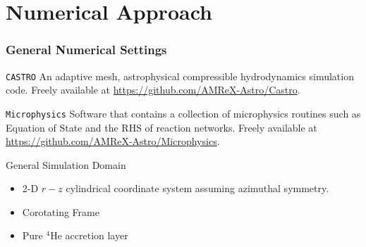 \documentclass[
	11pt, %
]{beamer}
\begin{document}
    


\section{Numerical Approach}


\begin{frame}
    \frametitle{General Numerical Settings}
    
    \begin{block}{\tt CASTRO}
    An adaptive mesh, astrophysical compressible hydrodynamics simulation code. Freely available at \url{https://github.com/AMReX-Astro/Castro}.
    \end{block}

    \begin{block}{\tt Microphysics}
    Software that contains a collection of microphysics routines such as Equation of State and the RHS of reaction networks. Freely available at \url{https://github.com/AMReX-Astro/Microphysics}.
    \end{block}

    \begin{block}{General Simulation Domain}
        \begin{itemize}
            \item 2-D $r-z$ cylindrical coordinate system assuming azimuthal symmetry.
            \item Corotating Frame
            \item Pure ${}^{4}$He accretion layer
        \end{itemize}
    \end{block}
    
\end{frame}
\end{document}
